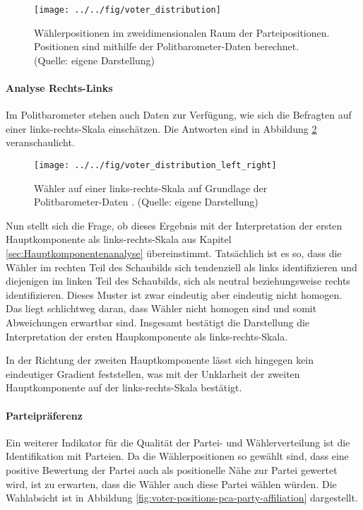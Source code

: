 \begin{figure}[htb]
	\centering
	\texttt{[image: ../../fig/voter\_distribution]}
	\caption{Wählerpositionen im zweidimensionalen Raum der Parteipositionen. Positionen sind mithilfe der Politbarometer-Daten \citep{politbarometer} berechnet. (Quelle: eigene Darstellung)}
	\label{fig:voter-positions-pca}
\end{figure}

\paragraph{Analyse Rechts-Links}
Im Politbarometer stehen auch Daten zur Verfügung, wie sich die Befragten auf einer links-rechts-Skala einschätzen. Die Antworten sind in Abbildung \ref{fig:voter-positions-pca-left-right} veranschaulicht.

\begin{figure}[htb]
	\centering
	\texttt{[image: ../../fig/voter\_distribution\_left\_right]}
	\caption{Wähler auf einer links-rechts-Skala auf Grundlage der Politbarometer-Daten \citep{politbarometer}. (Quelle: eigene Darstellung)}
	\label{fig:voter-positions-pca-left-right}
\end{figure}

Nun stellt sich die Frage, ob dieses Ergebnis mit der Interpretation der ersten Hauptkomponente als links-rechts-Skala aus Kapitel \ref{sec:Hauptkomponentenanalyse} übereinstimmt.
Tatsächlich ist es so, dass die Wähler im rechten Teil des Schaubilds sich tendenziell als links identifizieren und diejenigen im linken Teil des Schaubilds, sich als neutral beziehungsweise rechts identifizieren.
Dieses Muster ist zwar eindeutig aber eindeutig nicht homogen. Das liegt schlichtweg daran, dass Wähler nicht homogen sind und somit Abweichungen erwartbar sind.
Insgesamt bestätigt die Darstellung die Interpretation der ersten Haupkomponente als links-rechts-Skala.

In der Richtung der zweiten Hauptkomponente lässt sich hingegen kein eindeutiger Gradient feststellen, was mit der Unklarheit der zweiten Hauptkomponente auf der links-rechts-Skala bestätigt.

\paragraph{Parteipräferenz}

Ein weiterer Indikator für die Qualität der Partei- und Wählerverteilung ist die Identifikation mit Parteien. Da die Wählerpositionen so gewählt sind, dass eine positive Bewertung der Partei auch als positionelle Nähe zur Partei gewertet wird, ist zu erwarten, dass die Wähler auch diese Partei wählen würden. Die Wahlabsicht ist in Abbildung \ref{fig:voter-positions-pca-party-affiliation} dargestellt.

